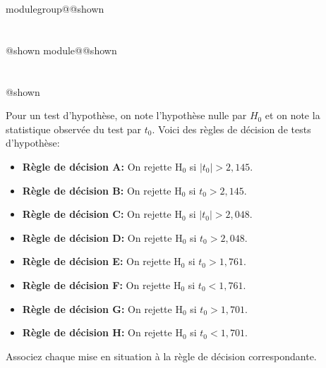 \documentclass{Evaluation}
\makeatletter
\newcommand{\currentmodulekey}{}
\newcommand{\currentmoduletitle}{}
\newcommand{\currentgroupkey}{}
\newcommand{\currentgrouptitle}{}
\newcommand{\showmoduleifneeded}{%
  \ifx\currentgroupkey\empty\else
    \expandafter\ifx\csname modulegroup@\currentgroupkey @shown\endcsname\relax
      \section*{\currentgrouptitle}%
      \expandafter\gdef\csname modulegroup@\currentgroupkey @shown\endcsname{1}%
    \fi
  \fi
  \expandafter\ifx\csname module@\currentmodulekey @shown\endcsname\relax
    \section*{\currentmoduletitle}%
    \expandafter\gdef\csname module@\currentmodulekey @shown\endcsname{1}%
  \fi
}
\newenvironment{A22}{\showmoduleifneeded}{}
\makeatother
\begin{document}
\begin{questions}
\begin{A22}
\medskip

Pour un test d'hypothèse, on note l'hypothèse nulle par $H_0$ et on note la statistique observée du test par $t_0$. Voici des règles de décision de tests d'hypothèse:

\begin{itemize}
    \item {\bf Règle de décision A:}  On rejette $\mathrm{H}_0$ si $|t_0| > 2,145$.
    \item {\bf Règle de décision B:} On rejette $\mathrm{H}_0$ si $t_0 > 2,145$.
    \item {\bf Règle de décision C:}  On rejette $\mathrm{H}_0$ si $|t_0| >2,048$.
    \item {\bf Règle de décision D:}  On rejette $\mathrm{H}_0$ si $t_0 >2,048$.
    \item {\bf Règle de décision E:} On rejette $\mathrm{H}_0$ si $t_0 > 1,761$.
    \item {\bf Règle de décision F:} On rejette $\mathrm{H}_0$ si $t_0 < 1,761$.
    \item {\bf Règle de décision G:}  On rejette $\mathrm{H}_0$ si $t_0 > 1,701$.
    \item {\bf Règle de décision H:}  On rejette $\mathrm{H}_0$ si $t_0 < 1,701$.
\end{itemize}

\medskip

Associez chaque mise en situation à la règle de décision correspondante.

\medskip

\end{A22}
\end{questions}
\end{document}
